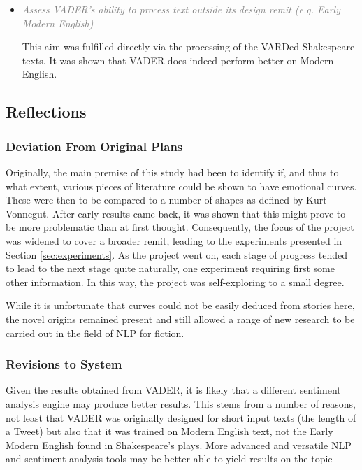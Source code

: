 \documentclass{article}
\begin{document}
{\begin{itemize}
            A survey of readers was carried out, obtaining 22 sets of results that was used for side-by-side analysis with VADER's graphs but also for self-analysis and comments around the Sentiplot tool.
            \item \textcolor{gray}{\textit{Assess VADER's ability to process text outside its design remit (e.g. Early Modern English)}}
            
            This aim was fulfilled directly via the processing of the VARDed Shakespeare texts. It was shown that VADER does indeed perform better on Modern English.
        \end{itemize}
    \subsection{Reflections}
        \subsubsection{Deviation From Original Plans}
            Originally, the main premise of this study had been to identify if, and thus to what extent, various pieces of literature could be shown to have emotional curves. These were then to be compared to a number of shapes as defined by Kurt Vonnegut. After early results came back, it was shown that this might prove to be more problematic than at first thought. Consequently, the focus of the project was widened to cover a broader remit, leading to the experiments presented in Section \ref{sec:experiments}. As the project went on, each stage of progress tended to lead to the next stage quite naturally, one experiment requiring first some other information. In this way, the project was self-exploring to a small degree.

            While it is unfortunate that curves could not be easily deduced from stories here, the novel origins remained present and still allowed a range of new research to be carried out in the field of NLP for fiction.
        \subsubsection{Revisions to System}
            Given the results obtained from VADER, it is likely that a different sentiment analysis engine may produce better results. This stems from a number of reasons, not least that VADER was originally designed for short input texts (the length of a Tweet) but also that it was trained on Modern English text, not the Early Modern English found in Shakespeare's plays. More advanced and versatile NLP and sentiment analysis tools may be better able to yield results on the topic

}
\end{document}

